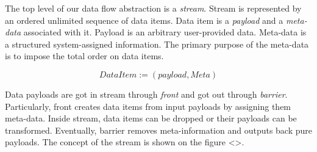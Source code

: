 
\label {fs-data-flow}

The top level of our data flow abstraction is a {\it stream}. Stream is represented by an ordered unlimited sequence of data items. Data item is a {\it payload} and a {\it meta-data} associated with it. Payload is an arbitrary user-provided data. Meta-data is a structured system-assigned information. The primary purpose of the meta-data is to impose the total order on data items. 

\[DataItem := (payload, Meta)\]

Data payloads are got in stream through {\it front} and got out through {\it barrier}. Particularly, front creates data items from input payloads by assigning them meta-data. Inside stream, data items can be dropped or their payloads can be transformed. Eventually, barrier removes meta-information and outputs back pure payloads. The concept of the stream is shown on the figure <>.
